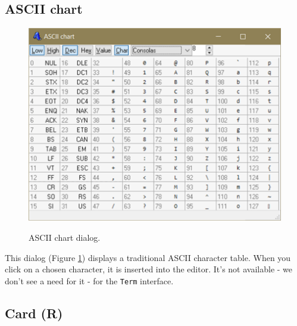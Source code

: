 \hypertarget{dlg_ascii_chart}{}
\subsection{ASCII chart}

\begin{figure}[H]
  \includegraphics[scale=0.80]{./res/dlg_ascii_chart.png} \\
  \caption{ASCII chart dialog.}
  \label{fig:dlg_ascii_chart}
\end{figure}
This dialog
(Figure \ref{fig:dlg_ascii_chart})
displays a traditional ASCII character table. When you click on a chosen character, it is inserted
into the editor. It's not available - we don't see a need for it - for the \texttt{Term} interface.


\hypertarget{dlg_r_card}{}
\subsection{Card (R)}

